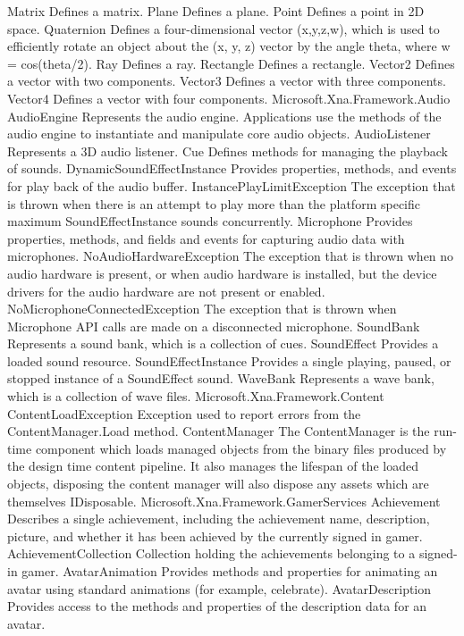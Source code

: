 	Matrix	Defines a matrix.
	Plane	Defines a plane.
	Point	Defines a point in 2D space.
	Quaternion	Defines a four-dimensional vector (x,y,z,w), which is used to efficiently rotate an object about the (x, y, z) vector by the angle theta, where w = cos(theta/2).
	Ray	Defines a ray.
	Rectangle	Defines a rectangle.
	Vector2	Defines a vector with two components.
	Vector3	Defines a vector with three components.
	Vector4	Defines a vector with four components.
Microsoft.Xna.Framework.Audio
	AudioEngine	Represents the audio engine. Applications use the methods of the audio engine to instantiate and manipulate core audio objects.
	AudioListener	Represents a 3D audio listener.
	Cue	Defines methods for managing the playback of sounds.
	DynamicSoundEffectInstance	 Provides properties, methods, and events for play back of the audio buffer.
	InstancePlayLimitException	The exception that is thrown when there is an attempt to play more than the platform specific maximum SoundEffectInstance sounds concurrently.
	Microphone	Provides properties, methods, and fields and events for capturing audio data with microphones.
	NoAudioHardwareException	The exception that is thrown when no audio hardware is present, or when audio hardware is installed, but the device drivers for the audio hardware are not present or enabled.
	NoMicrophoneConnectedException	The exception that is thrown when Microphone API calls are made on a disconnected microphone.
	SoundBank	Represents a sound bank, which is a collection of cues.
	SoundEffect	Provides a loaded sound resource.
	SoundEffectInstance	Provides a single playing, paused, or stopped instance of a SoundEffect sound.
	WaveBank	Represents a wave bank, which is a collection of wave files.
Microsoft.Xna.Framework.Content
	ContentLoadException	Exception used to report errors from the ContentManager.Load method.
	ContentManager	 The ContentManager is the run-time component which loads managed objects from the binary files produced by the design time content pipeline. It also manages the lifespan of the loaded objects, disposing the content manager will also dispose any assets which are themselves IDisposable.
Microsoft.Xna.Framework.GamerServices
	Achievement	Describes a single achievement, including the achievement name, description, picture, and whether it has been achieved by the currently signed in gamer.
	AchievementCollection	Collection holding the achievements belonging to a signed-in gamer.
	AvatarAnimation	Provides methods and properties for animating an avatar using standard animations (for example, celebrate).
	AvatarDescription	Provides access to the methods and properties of the description data for an avatar.
